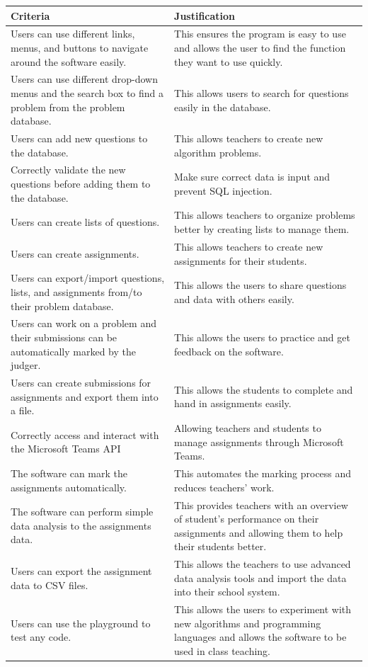 \documentclass[a4paper]{report}
\begin{document}
\begin{tabulary}{\linewidth}{|L|L|}
    \hline
    Criteria & Justification\\
    \hline
    Users can use different links, menus, and buttons to navigate around the software easily. & This ensures the program is easy to use and allows the user to find the function they want to use quickly.\\
    \hline
    Users can use different drop-down menus and the search box to find a problem from the problem database. & This allows users to search for questions easily in the database.\\
    \hline
    Users can add new questions to the database. & This allows teachers to create new algorithm problems.\\
    \hline
    Correctly validate the new questions before adding them to the database. & Make sure correct data is input and prevent SQL injection.\\
    \hline
    Users can create lists of questions. & This allows teachers to organize problems better by creating lists to manage them.\\
    \hline
    Users can create assignments. & This allows teachers to create new assignments for their students.\\
    \hline
    Users can export/import questions, lists, and assignments from/to their problem database. & This allows the users to share questions and data with others easily.\\
    \hline
    Users can work on a problem and their submissions can be automatically marked by the judger. & This allows the users to practice and get feedback on the software.\\
    \hline
    Users can create submissions for assignments and export them into a file. & This allows the students to complete and hand in assignments easily.\\
    \hline
    Correctly access and interact with the Microsoft Teams API & Allowing teachers and students to manage assignments through Microsoft Teams.\\
    \hline
    The software can mark the assignments automatically. & This automates the marking process and reduces teachers' work.\\
    \hline
    The software can perform simple data analysis to the assignments data. & This provides teachers with an overview of student's performance on their assignments and allowing them to help their students better.\\
    \hline
    Users can export the assignment data to CSV files. & This allows the teachers to use advanced data analysis tools and import the data into their school system.\\
    \hline
    Users can use the playground to test any code. & This allows the users to experiment with new algorithms and programming languages and allows the software to be used in class teaching.\\
    \hline
\end{tabulary}
\end{document}
